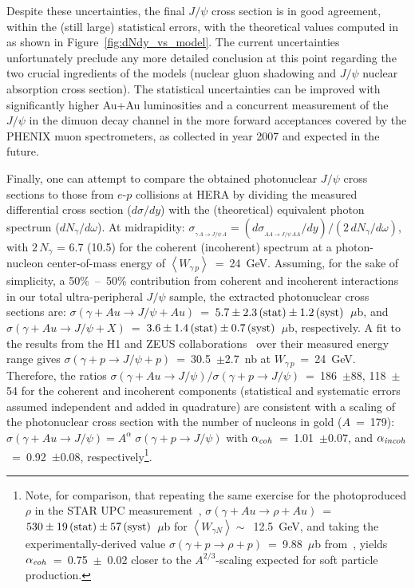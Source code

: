\documentclass[dvipdfm]{elsart}
\def\mean#1{\ensuremath{\left<#1\right>}}
\def\fig#1{{Figure~\ref{#1}}}
\providecommand{\jpsi}{J/\psi}
\providecommand{\mean}[1]{\ensuremath{\left<#1\right>}}
\begin{document}
Despite these uncertainties, the final $\jpsi$ cross section is in good 
agreement, within the (still large) statistical errors, with the theoretical 
values computed 
in~\cite{Baltz:2002pp,Strikman:2005ze,Klein:1999qj,Ivanov:2007ms,Nystrand:2004vn,Goncalves:2007qu} 
as shown in \fig{fig:dNdy_vs_model}. The current uncertainties unfortunately 
preclude any more detailed conclusion at this point regarding the two crucial 
ingredients of the models (nuclear gluon shadowing and $\jpsi$ nuclear 
absorption cross section). The statistical uncertainties can be improved with 
significantly higher Au+Au luminosities and a concurrent measurement of the 
$\jpsi$ in the dimuon decay channel in the more forward acceptances covered 
by the PHENIX muon spectrometers, as collected in year 2007 and expected in 
the future.

Finally, one can attempt to compare the obtained photonuclear $\jpsi$ cross 
sections to those from $e$-$p$ collisions at HERA by dividing the measured 
differential cross section ($d \sigma/dy$) with the (theoretical) equivalent 
photon spectrum ($dN_{\gamma}/d\omega$). At midrapidity: 
$\sigma_{_{\gamma\,A\to \jpsi\,A}} =(d\sigma_{_{AA\to 
\jpsi\,AA}}/dy)/(2\,dN_{\gamma}/d\omega)$, with $2\,N_{\gamma}$ = 6.7 (10.5) 
for the coherent (incoherent) spectrum at a photon-nucleon center-of-mass 
energy of $\mean{W_{\gamma\,p}}$~=~24~GeV. Assuming, for the sake of 
simplicity, a 50\%~--~50\% contribution from coherent and incoherent 
interactions in our total ultra-peripheral $\jpsi$ sample, the extracted 
photonuclear cross sections are: $\sigma(\gamma+Au \to \jpsi+Au)$~=~$5.7 \pm 
2.3 \, {\rm(stat)} \pm 1.2 \, {\rm(syst)} $~$\mu$b, and $\sigma(\gamma+Au \to 
\jpsi+X)$~=~$3.6 \pm 1.4 \, {\rm(stat)} \pm 0.7 \, {\rm(syst)} $~$\mu$b, 
respectively. A fit to the results from the H1 and ZEUS 
collaborations~\cite{Chekanov:2002xi,Aktas:2005xu} over their measured energy 
range gives $\sigma(\gamma+p \to \jpsi+p)$~=~30.5~$\pm$2.7~nb at 
$W_{\gamma\,p}$~=~24~GeV. Therefore, the ratios $\sigma(\gamma+Au \to 
\jpsi)/\sigma(\gamma+p\to \jpsi)$~=~186~$\pm$88, 118~$\pm$54 for the coherent 
and incoherent components (statistical and systematic errors assumed 
independent and added in quadrature) are consistent with a scaling of the 
photonuclear cross section with the number of nucleons in gold ($A$~=~179): 
$\sigma(\gamma+Au \to \jpsi)=A^\alpha\;\sigma(\gamma+p \to \jpsi)$ with 
$\alpha_{{\ensuremath{\it coh}}}$~=~1.01~$\pm$0.07, and 
$\alpha_{{\ensuremath{\it incoh}}}$~=~0.92~$\pm$0.08, 
respectively\footnote{Note, for comparison, that repeating the same exercise 
for the photoproduced $\rho$ in the STAR UPC 
measurement~\cite{Abelev:2007nb}, $\sigma(\gamma+Au \to \rho+Au)$~=~$530 \pm 
19 \, {\rm(stat)} \pm 57 \, {\rm(syst)} $~$\mu$b for $\mean{W_{\gamma 
N}}\sim$~12.5~GeV, and taking the experimentally-derived value 
$\sigma(\gamma+p\to\rho+p)$~=~9.88~$\mu$b from~\cite{Klein:1999qj}, yields 
$\alpha_{{\ensuremath{\it coh}}}$~=~0.75~$\pm$~0.02 closer to the 
$A^{2/3}$-scaling expected for soft particle production.}.
\end{document}
